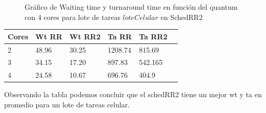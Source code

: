 \begin{figure}[H]
\hfill
{}
\hfill
{}
\hfill
\caption{Gráfico de Waiting time y turnaround time en función del quantum con 4 cores para lote de tareas $loteCelular$ en SchedRR2}
\end{figure}

\begin{center}
    \begin{tabular}{ | l | l | l | l | l | p{5cm} |}
    \hline
    Cores & Wt RR & Wt RR2 & Ta RR & Ta RR2 \\ \hline
    2 & 48.96 & 30.25 & 1208.74 & 815.69 \\ \hline
    3 & 34.15 & 17.20 & 897.83 & 542.165 \\ \hline
    4 & 24.58 & 10.67 & 696.76 & 404.9 \\
	\hline
    \end{tabular}
\end{center}

Observando la tabla podemos concluir que el schedRR2 tiene un mejor wt y ta en promedio para un lote de tareas celular.

